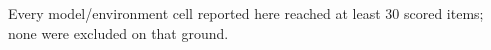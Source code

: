 Every model/environment cell reported here reached at least 30 scored items; none were excluded on that ground.
